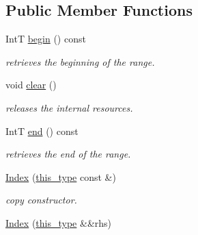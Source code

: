 \subsection*{Public Member Functions}
\begin{DoxyCompactItemize}
\item 
\hypertarget{classhryky_1_1_index_a26c8fe53f07dbc3a0f932c594f8afab3}{Int\-T \hyperlink{classhryky_1_1_index_a26c8fe53f07dbc3a0f932c594f8afab3}{begin} () const }\label{classhryky_1_1_index_a26c8fe53f07dbc3a0f932c594f8afab3}

\begin{DoxyCompactList}\small\item\em retrieves the beginning of the range. \end{DoxyCompactList}\item 
\hypertarget{classhryky_1_1_index_aaa1f68afe5dff5a7df14812ff16fd13d}{void \hyperlink{classhryky_1_1_index_aaa1f68afe5dff5a7df14812ff16fd13d}{clear} ()}\label{classhryky_1_1_index_aaa1f68afe5dff5a7df14812ff16fd13d}

\begin{DoxyCompactList}\small\item\em releases the internal resources. \end{DoxyCompactList}\item 
\hypertarget{classhryky_1_1_index_a9c9aa7850b38616636afd3148e9bb5f1}{Int\-T \hyperlink{classhryky_1_1_index_a9c9aa7850b38616636afd3148e9bb5f1}{end} () const }\label{classhryky_1_1_index_a9c9aa7850b38616636afd3148e9bb5f1}

\begin{DoxyCompactList}\small\item\em retrieves the end of the range. \end{DoxyCompactList}\item 
\hypertarget{classhryky_1_1_index_a14c8de3e4620e853f3eb8baf8784cad9}{\hyperlink{classhryky_1_1_index_a14c8de3e4620e853f3eb8baf8784cad9}{Index} (\hyperlink{classhryky_1_1_index_a0dab4f087ed4d752f8d5040163782102}{this\-\_\-type} const \&)}\label{classhryky_1_1_index_a14c8de3e4620e853f3eb8baf8784cad9}

\begin{DoxyCompactList}\small\item\em copy constructor. \end{DoxyCompactList}\item 
\hypertarget{classhryky_1_1_index_a0c610735923728d429b50ce671f63230}{\hyperlink{classhryky_1_1_index_a0c610735923728d429b50ce671f63230}{Index} (\hyperlink{classhryky_1_1_index_a0dab4f087ed4d752f8d5040163782102}{this\-\_\-type} \&\&rhs)}\label{classhryky_1_1_index_a0c610735923728d429b50ce671f63230}


\end{DoxyCompactItemize}
